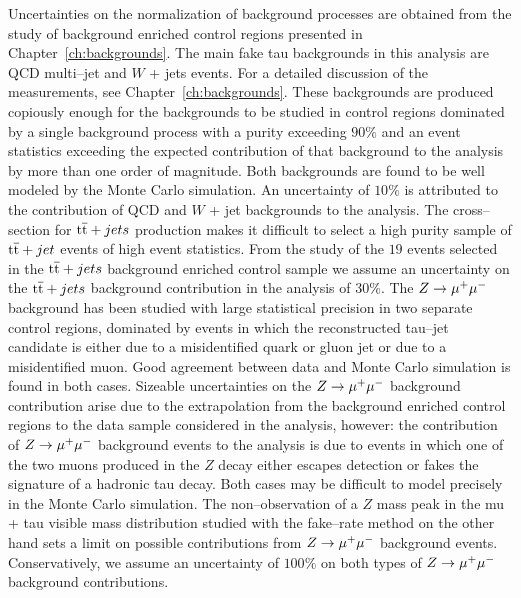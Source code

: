 Uncertainties on the normalization of background processes are obtained from the
study of background enriched control regions presented in
Chapter~\ref{ch:backgrounds}.  The main fake tau backgrounds in this analysis
are QCD multi--jet and $W$ + jets events.  For a detailed discussion of the
measurements, see Chapter~\ref{ch:backgrounds}.  These backgrounds are produced
copiously enough for the backgrounds to be studied in control regions dominated
by a single background process with a purity exceeding $90\%$ and an event
statistics exceeding the expected contribution of that background to the
analysis by more than one order of magnitude.  Both backgrounds are found to be
well modeled by the Monte Carlo simulation.  An uncertainty of $10\%$ is
attributed to the contribution of QCD and $W$ + jet backgrounds to the analysis.
The cross--section for $\mathrm{t}\overline{\mathrm{t}} + jets$ production makes it difficult to select a
high purity sample of $\mathrm{t}\overline{\mathrm{t}} + jet$ events of high event statistics.  From the
study of the $19$ events selected in the $\mathrm{t}\overline{\mathrm{t}} + jets$ background enriched
control sample we assume an uncertainty on the $\mathrm{t}\overline{\mathrm{t}} + jets$ background
contribution in the analysis of $30\%$.  The $Z \to \mu^+\mu^-$ background has been
studied with large statistical precision in two separate control regions,
dominated by events in which the reconstructed tau--jet candidate is either due
to a misidentified quark or gluon jet or due to a misidentified muon.  Good
agreement between data and Monte Carlo simulation is found in both cases.
Sizeable uncertainties on the $Z \to \mu^+\mu^-$ background contribution arise due to
the extrapolation from the background enriched control regions to the data
sample considered in the analysis, however: the contribution of $Z \to \mu^+\mu^-$
background events to the analysis is due to events in which one of the two muons
produced in the $Z$ decay either escapes detection or fakes the signature of a
hadronic tau decay.  Both cases may be difficult to model precisely in the Monte
Carlo simulation.  The non--observation of a $Z$ mass peak in the mu + tau
visible mass distribution studied with the fake--rate method on the other hand
sets a limit on possible contributions from $Z \to \mu^+\mu^-$ background events.
Conservatively, we assume an uncertainty of $100\%$ on both types of $Z \to \mu^+\mu^-$
background contributions.

